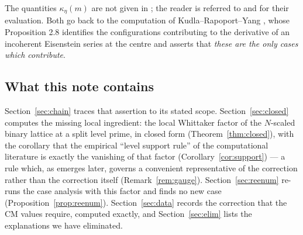 \documentclass[11pt,reqno]{amsart}
\theoremstyle{plain}
\theoremstyle{definition}
\begin{document}
The quantities $\kappa_\eta(m)$ are not given in \cite{GY}; the reader is referred to
\cite{Errthum} and \cite{Yang} for their evaluation. Both go back to the computation of
Kudla--Rapoport--Yang \cite{KRY}, whose Proposition 2.8 identifies the configurations contributing
to the derivative of an incoherent Eisenstein series at the centre and asserts that
\emph{these are the only cases which contribute}.

\subsection*{What this note contains}
Section~\ref{sec:chain} traces that assertion to its stated scope. Section~\ref{sec:closed}
computes the missing local ingredient: the local Whittaker factor of the $N$-scaled binary lattice
at a split level prime, in closed form (Theorem~\ref{thm:closed}), with the corollary that the
empirical ``level support rule'' of the computational literature is exactly the vanishing of that
factor (Corollary~\ref{cor:support}) --- a rule which, as emerges later, governs a convenient
representative of the correction rather than the correction itself
(Remark~\ref{rem:gauge}). Section~\ref{sec:reenum} re-runs the case analysis with this
factor and finds no new case (Proposition~\ref{prop:reenum}). Section~\ref{sec:data} records the
correction that the CM values require, computed exactly, and Section~\ref{sec:elim} lists the
explanations we have eliminated.
\end{document}
